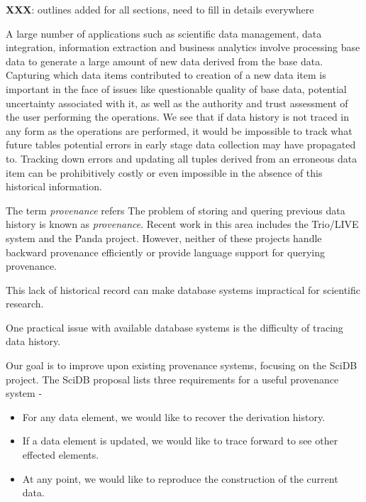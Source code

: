 \textbf{XXX}: outlines added for all sections, need to fill in details everywhere

A large number of applications such as scientific data management, data integration, information extraction and business analytics involve processing base data to generate a large amount of new data derived from the base data. Capturing which data items contributed to creation of a new data item is important in the face of issues like questionable quality of base data, potential uncertainty associated with it, as well as the authority and trust assessment of the user performing the operations. We see that if data history is not traced in any form as the operations are performed, it would be impossible to track what future tables potential errors in early stage data collection may have propagated to. Tracking down errors and updating all tuples derived from an erroneous data item can be prohibitively costly or even impossible in the absence of this historical information.

The term \textit{provenance} refers 
The problem of storing and quering previous data history is known as \emph{provenance}. Recent work in this area includes the Trio/LIVE system and the Panda project. However, neither of these projects handle backward provenance efficiently or provide language support for querying provenance.

This lack of historical record can make database systems impractical for scientific research. 

One practical issue with available database systems is the difficulty of tracing data history. 

Our goal is to improve upon existing provenance systems, focusing on the SciDB project. The SciDB proposal \cite{stonebraker9requirements} lists three requirements for a useful provenance system -

\begin{itemize}
\item For any data element, we would like to recover the derivation history. 
\item If a data element is updated, we would like to trace forward to see other effected elements.
\item At any point, we would like to reproduce the construction of the current data. 
\end{itemize}

